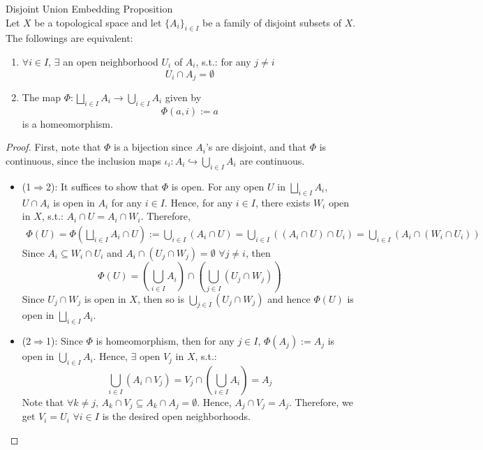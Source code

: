 \begin{proposition}{Disjoint Union Embedding Proposition}\\
Let $X$ be a topological space and let $\{A_i\}_{i \in I}$ be a family of disjoint subsets of $X$. The followings are equivalent:
\begin{enumerate}
    \item $\forall i \in I$, $\exists$ an open neighborhood $U_i$ of $A_i$, s.t.: for any $j \neq i$
    $$U_i \cap A_j = \emptyset$$

    \item The map $\Phi: \bigsqcup_{i \in I}A_i \to \bigcup_{i \in I} A_i$ given by
    $$\Phi(a,i) := a$$
    is a homeomorphism.
\end{enumerate}
\end{proposition}

\begin{proof}
    First, note that $\Phi$ is a bijection since $A_i$'s are disjoint, and that $\Phi$ is continuous, since the inclusion maps $\iota_i :A_i \hookrightarrow \bigcup_{i \in I}A_i$ are continuous.
    \begin{itemize}
        \item (1$\Rightarrow$2): It suffices to show that $\Phi$ is open. For any open $U$ in $\bigsqcup_{i \in I}A_i$, $U \cap A_i$ is open in $A_i$ for any $i \in I$. Hence, for any $i \in I$, there exists $W_i$ open in $X$, s.t.: $A_i \cap U = A_i\cap W_i$. Therefore,
        \begin{align*}
            \Phi(U) = \Phi(\bigsqcup_{i \in I}A_i \cap U) := \bigcup_{i \in I} (A_i \cap U) = \bigcup_{i \in I} ((A_i \cap U) \cap U_i) = \bigcup_{i \in I} (A_i \cap (W_i \cap U_i))
        \end{align*}
        Since $A_i \subseteq W_i \cap U_i$ and $A_i \cap (U_j \cap W_j)=\emptyset$ $\forall j \neq i$, then
        $$\Phi(U) = (\bigcup_{i\in I} A_i) \cap (\bigcup_{j \in I} (U_j \cap W_j))$$
        Since $U_j \cap W_j$ is open in $X$, then so is $\bigcup_{j \in I} (U_j \cap W_j)$ and hence $\Phi(U)$ is open in $\bigsqcup_{i \in I} A_i$.

        \item (2$\Rightarrow$1): Since $\Phi$ is homeomorphism, then for any $j \in I$, $\Phi(A_j) := A_j$ is open in $\bigcup_{i\in I}A_i$. Hence, $\exists$ open $V_j$ in $X$, s.t.:
        $$\bigcup_{i \in I} (A_i \cap V_j) = V_j \cap (\bigcup_{i \in I}A_i) = A_j$$
        Note that $\forall k \neq j$, $A_k \cap V_j \subseteq A_k \cap A_j = \emptyset$. Hence, $A_j \cap V_j = A_j$. Therefore, we get $V_i = U_i$ $\forall i \in I$ is the desired open neighborhoods.
    \end{itemize}
\end{proof}

